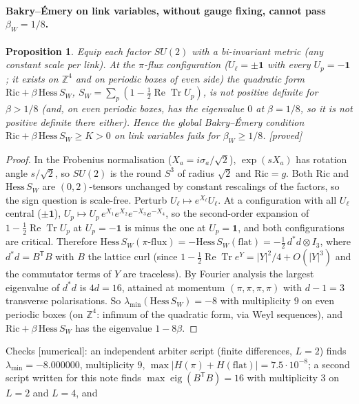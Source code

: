 \documentclass[11pt,a4paper]{article}
\newtheorem{proposition}[theorem]{Proposition}
\theoremstyle{remark}
\theoremstyle{definition}
\theoremstyle{plain}
\theoremstyle{remark}
\newcommand{\Z}{\mathbb{Z}}
\newcommand{\ReTr}{\operatorname{Re}\operatorname{Tr}}
\newcommand{\st}[1]{\textsf{[#1]}}
\begin{document}
\paragraph{Bakry--\'Emery on link variables, without gauge fixing, cannot pass $\beta_W=1/8$.}
\begin{proposition}\label{prop:piflux}
Equip each factor $SU(2)$ with a bi-invariant metric (any constant scale per link). At the $\pi$-flux
configuration ($U_\ell=\pm\mathbf 1$ with every $U_p=-\mathbf 1$; it exists on $\Z^4$ and on periodic boxes of
even side) the quadratic form $\mathrm{Ric}+\beta\,\mathrm{Hess}\,S_W$, $S_W=\sum_p(1-\frac12\ReTr U_p)$, is not
positive definite for $\beta>1/8$ (and, on even periodic boxes, has the eigenvalue $0$ at $\beta=1/8$, so it
is not positive definite there either). Hence the global Bakry--\'Emery
condition $\mathrm{Ric}+\beta\,\mathrm{Hess}\,S_W\ge K>0$ on link variables fails for $\beta_W\ge1/8$. \st{proved}
\end{proposition}
\begin{proof}
In the Frobenius normalisation ($X_a=i\sigma_a/\sqrt2$), $\exp(sX_a)$ has rotation angle $s/\sqrt2$, so
$SU(2)$ is the round $S^3$ of radius $\sqrt2$ and $\mathrm{Ric}=g$. Both $\mathrm{Ric}$ and $\mathrm{Hess}\,S_W$ are
$(0,2)$-tensors unchanged by constant rescalings of the factors, so the sign question is scale-free.
Perturb $U_\ell\mapsto e^{X_\ell}U_\ell$. At a configuration with all $U_\ell$ central ($\pm\mathbf 1$),
$U_p\mapsto U_p\,e^{X_1}e^{X_2}e^{-X_3}e^{-X_4}$, so the second-order expansion of $1-\frac12\ReTr U_p$ at
$U_p=-\mathbf 1$ is minus the one at $U_p=\mathbf 1$, and both configurations are critical. Therefore
$\mathrm{Hess}\,S_W(\pi\text{-flux})=-\mathrm{Hess}\,S_W(\text{flat})=-\frac12\,d^*d\otimes I_3$, where $d^*d=B^{\mathsf T}B$
with $B$ the lattice curl (since $1-\frac12\ReTr e^{Y}=|Y|^2/4+O(|Y|^3)$ and the commutator terms of $Y$ are
traceless). By Fourier analysis the largest eigenvalue of $d^*d$ is $4d=16$, attained at momentum
$(\pi,\pi,\pi,\pi)$ with $d-1=3$ transverse polarisations. So $\lambda_{\min}(\mathrm{Hess}\,S_W)=-8$ with
multiplicity $9$ on even periodic boxes (on $\Z^4$: infimum of the quadratic form, via Weyl sequences), and
$\mathrm{Ric}+\beta\,\mathrm{Hess}\,S_W$ has the eigenvalue $1-8\beta$.
\end{proof}
Checks \st{numerical}: an independent arbiter script (finite differences, $L=2$) finds
$\lambda_{\min}=-8.000000$, multiplicity $9$, $\max|H(\pi)+H(\text{flat})|=7.5\cdot10^{-8}$; a second script
written for this note finds $\max\operatorname{eig}(B^{\mathsf T}B)=16$ with multiplicity $3$ on $L=2$ and $L=4$, and
\end{document}
